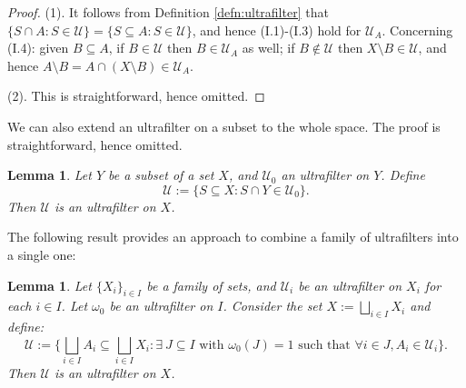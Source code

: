 \documentclass[12pt, a4paper]{amsart}
\numberwithin{equation}{section}
\newtheorem{lem}[thm]{Lemma}
\theoremstyle{definition}
\theoremstyle{remark}
\def\U{\mathcal{U}}
\begin{document}
\begin{proof}
(1). It follows from Definition \ref{defn:ultrafilter} that $\{S \cap A: S \in \U\} = \{S \subseteq A: S \in \U\}$, and hence (I.1)-(I.3) hold for $\U_A$. Concerning (I.4): given $B \subseteq A$, if $B \in \U$ then $B \in \U_A$ as well; if $B \notin \U$ then $X \setminus B \in \U$, and hence $A \setminus B = A \cap (X \setminus B) \in \U_A$.


(2). This is straightforward, hence omitted.
\end{proof}

We can also extend an ultrafilter on a subset to the whole space. The proof is straightforward, hence omitted.

\begin{lem}\label{lem:ultraextension}
Let $Y$ be a subset of a set $X$, and $\U_0$ an ultrafilter on $Y$. Define 
\[
\U:=\{S \subseteq X: S \cap Y \in \U_0\}.
\]
Then $\U$ is an ultrafilter on $X$.
\end{lem}

The following result provides an approach to combine a family of ultrafilters into a single one:

\begin{lem}\label{lem:ultraunion}
Let $\{X_i\}_{i\in I}$ be a family of sets, and $\U_i$ be an ultrafilter on $X_i$ for each $i\in I$. Let $\omega_0$ be an ultrafilter on $I$. Consider the set $X:=\bigsqcup_{i\in I} X_i$ and define:
\[
\U:=\big\{ \bigsqcup_{i\in I} A_i \subseteq \bigsqcup_{i\in I} X_i: \exists~J \subseteq I \text{ with } \omega_0(J)=1 \text{ such that } \forall i\in J, A_i \in \U_i \big\}.
\]
Then $\U$ is an ultrafilter on $X$.
\end{lem}
\end{document}
